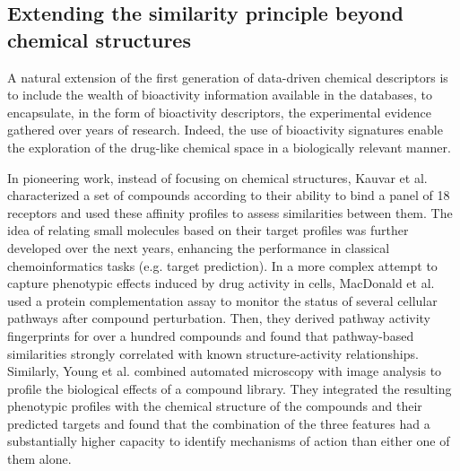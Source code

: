\subsection{Extending the similarity principle beyond chemical structures}
\label{Introduction_extending}

A natural extension of the first generation of data-driven chemical descriptors is to include the wealth of bioactivity information available in the databases, to encapsulate, in the form of bioactivity descriptors, the experimental evidence gathered over years of research. Indeed, the use of bioactivity signatures enable the exploration of the drug-like chemical space in a biologically relevant manner. 

In pioneering work, instead of focusing on chemical structures, Kauvar et al. \cite{kauvar_predicting_1995} characterized a set of compounds according to their ability to bind a panel of 18 receptors and used these affinity profiles to assess similarities between them. The idea of relating small molecules based on their target profiles was further developed over the next years\cite{paolini_global_2006, keiser_predicting_2009}, enhancing the performance in classical chemoinformatics tasks (e.g. target prediction). In a more complex attempt to capture phenotypic effects induced by drug activity in cells, MacDonald et al. \cite{macdonald_identifying_2006} used a protein complementation assay to monitor the status of several cellular pathways after compound perturbation. Then, they derived pathway activity fingerprints for over a hundred compounds and found that pathway-based similarities strongly correlated with known structure-activity relationships. Similarly, Young et al. \cite{young_integrating_2008} combined automated microscopy with image analysis to profile the biological effects of a compound library. They integrated the resulting phenotypic profiles with the chemical structure of the compounds and their predicted targets and found that the combination of the three features had a substantially higher capacity to identify mechanisms of action than either one of them alone.


